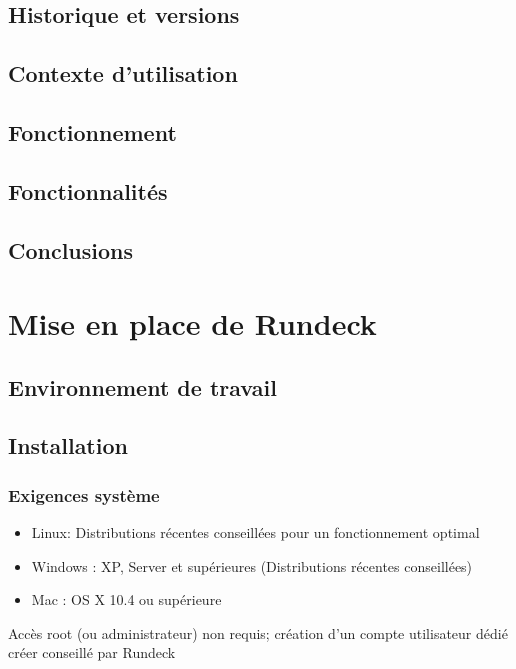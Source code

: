 \documentclass[12pt]{article}
\begin{document}
\subsection{Historique et versions}
\subsection{Contexte d'utilisation}
\subsection{Fonctionnement}
\subsection{Fonctionnalités}
\subsection{Conclusions}

\section{Mise en place de Rundeck}
\subsection{Environnement de travail}
\subsection{Installation}
\subsubsection{Exigences système}

\begin{itemize}
    \item Linux: Distributions récentes conseillées pour un fonctionnement optimal
    \item Windows : XP, Server et supérieures (Distributions récentes conseillées)
    \item Mac : OS X 10.4 ou supérieure
\end{itemize}

\vspace{0.5cm}

Accès root (ou administrateur) non requis; création d'un compte utilisateur dédié créer conseillé par Rundeck 

\vspace{0.5cm}
\end{document}
